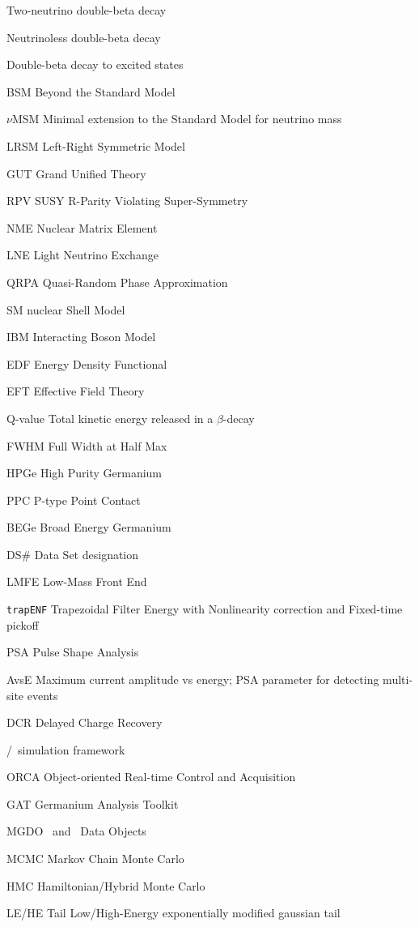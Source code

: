 \begin{glossary}
\item[\tnbb] Two-neutrino double-beta decay
\item[\znbb] Neutrinoless double-beta decay
\item[\bbes] Double-beta decay to excited states
\item[BSM] Beyond the Standard Model
\item[$\nu$MSM] Minimal extension to the Standard Model for neutrino mass
\item[LRSM] Left-Right Symmetric Model
\item[GUT] Grand Unified Theory
\item[RPV SUSY] R-Parity Violating Super-Symmetry
\item[NME] Nuclear Matrix Element
\item[LNE] Light Neutrino Exchange
\item[QRPA] Quasi-Random Phase Approximation
\item[SM] nuclear Shell Model
\item[IBM] Interacting Boson Model
\item[EDF] Energy Density Functional
\item[EFT] Effective Field Theory
\item[Q-value] Total kinetic energy released in a $\beta$-decay
\item[FWHM] Full Width at Half Max
\item[HPGe] High Purity Germanium
\item[PPC] P-type Point Contact
\item[BEGe] Broad Energy Germanium
  \item[DS\#] Data Set designation
\item[LMFE] Low-Mass Front End
\item[\texttt{trapENF}] Trapezoidal Filter Energy with Nonlinearity correction and Fixed-time pickoff
\item[PSA] Pulse Shape Analysis
\item[AvsE] Maximum current amplitude vs energy; PSA parameter for detecting multi-site events
\item[DCR] Delayed Charge Recovery
\item[\Mage] \MJ/\Gerda\ simulation framework
\item[ORCA] Object-oriented Real-time Control and Acquisition
\item[GAT] Germanium Analysis Toolkit
\item[MGDO] \MJ\ and \Gerda\ Data Objects
\item[MCMC] Markov Chain Monte Carlo
\item[HMC] Hamiltonian/Hybrid Monte Carlo
\item[LE/HE Tail] Low/High-Energy exponentially modified gaussian tail
  
\end{glossary}
